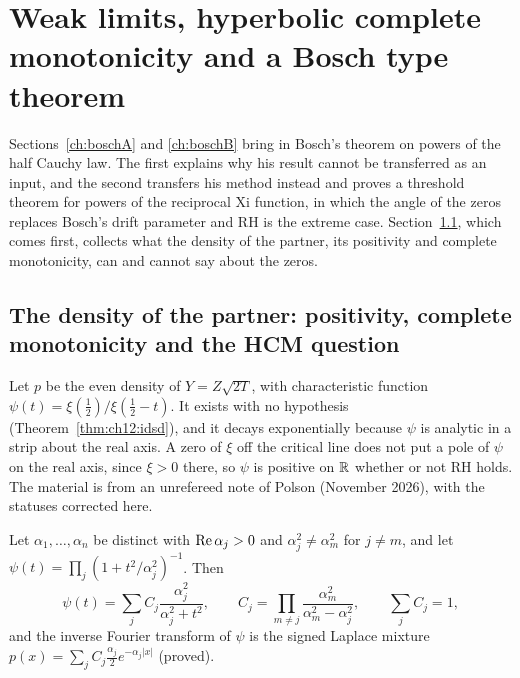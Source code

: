 \chapter{Weak limits, hyperbolic complete monotonicity and a Bosch type theorem}\label{chap:hcm}

Sections~\ref{ch:boschA} and \ref{ch:boschB} bring in Bosch's theorem on powers of the half Cauchy law. The first explains why his result cannot be transferred as an input, and the second transfers his method instead and proves a threshold theorem for powers of the reciprocal Xi function, in which the angle of the zeros replaces Bosch's drift parameter and RH is the extreme case. Section~\ref{xi:sec:cmq}, which comes first, collects what the density of the partner, its positivity and complete monotonicity, can and cannot say about the zeros.

\section{The density of the partner: positivity, complete monotonicity and the HCM question}\label{xi:sec:cmq}\label{xi:sec:density}

Let $p$ be the even density of $Y=Z\sqrt{2T}$, with characteristic function $\psi(t)=\xi(\frac12)/\xi(\frac12-t)$. It exists with no hypothesis (Theorem~\ref{thm:ch12:idsd}), and it decays exponentially because $\psi$ is analytic in a strip about the real axis. A zero of $\xi$ off the critical line does not put a pole of $\psi$ on the real axis, since $\xi>0$ there, so $\psi$ is positive on $\mathbb{R}$ whether or not RH holds. The material is from an unrefereed note of Polson (November 2026), with the statuses corrected here.

\begin{proposition}\label{xi:prop:mixture}
Let $\alpha_1,\dots,\alpha_n$ be distinct with $\operatorname{Re}\alpha_j>0$ and $\alpha_j^2\ne\alpha_m^2$ for $j\ne m$, and let $\psi(t)=\prod_j(1+t^2/\alpha_j^2)^{-1}$. Then
\begin{equation}\label{xi:eq:mixture}
\psi(t)=\sum_jC_j\frac{\alpha_j^2}{\alpha_j^2+t^2},\qquad C_j=\prod_{m\ne j}\frac{\alpha_m^2}{\alpha_m^2-\alpha_j^2},\qquad\sum_jC_j=1,
\end{equation}
and the inverse Fourier transform of $\psi$ is the signed Laplace mixture $p(x)=\sum_jC_j\frac{\alpha_j}2e^{-\alpha_j|x|}$ (proved).
\end{proposition}

